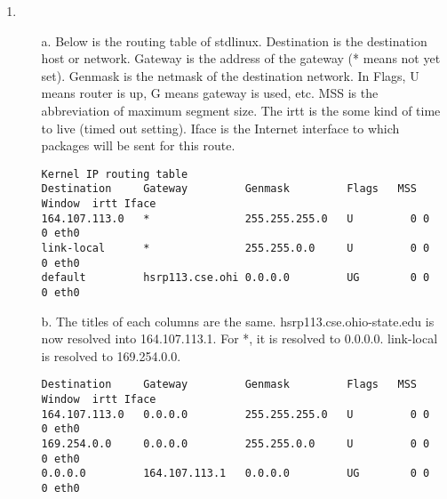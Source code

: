 \documentclass[12pt]{article}
\begin{document}
\begin{singlespace}
\begin{enumerate}
\item
	\begin{itemize}
	\item[a.] Below is the routing table of stdlinux. Destination is the destination host or network. Gateway is the address of the gateway (* means not yet set). Genmask is the netmask of the destination network. In Flags, U means router is up, G means gateway is used, etc. MSS is the abbreviation of maximum segment size. The irtt is the  some kind of time to live (timed out setting). Iface is the Internet interface to which packages will be sent for this route.
		\begin{lstlisting}[basicstyle=\ttfamily\scriptsize]
% /bin/netstat -r
Kernel IP routing table
Destination     Gateway         Genmask         Flags   MSS Window  irtt Iface
164.107.113.0   *               255.255.255.0   U         0 0          0 eth0
link-local      *               255.255.0.0     U         0 0          0 eth0
default         hsrp113.cse.ohi 0.0.0.0         UG        0 0          0 eth0
		\end{lstlisting}
	\item[b.] The titles of each columns are the same. hsrp113.cse.ohio-state.edu is now resolved into 164.107.113.1. For *, it is resolved to 0.0.0.0. link-local is resolved to 169.254.0.0.
		\begin{lstlisting}[basicstyle=\ttfamily\scriptsize]
Destination     Gateway         Genmask         Flags   MSS Window  irtt Iface
164.107.113.0   0.0.0.0         255.255.255.0   U         0 0          0 eth0
169.254.0.0     0.0.0.0         255.255.0.0     U         0 0          0 eth0
0.0.0.0         164.107.113.1   0.0.0.0         UG        0 0          0 eth0
		\end{lstlisting}
	\end{itemize}
\end{enumerate}
\end{singlespace}

\clearpage
\end{document}
